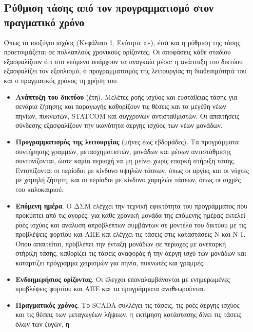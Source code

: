 \subsection{Ρύθμιση τάσης από τον προγραμματισμό στον πραγματικό χρόνο}
\label{sec:v-stages}

Όπως το ισοζύγιο ισχύος (Κεφάλαιο 1, Ενότητα «»), έτσι και η ρύθμιση της
τάσης προετοιμάζεται σε πολλαπλούς χρονικούς ορίζοντες. Οι αποφάσεις κάθε σταδίου εξασφαλίζουν
ότι στο επόμενο υπάρχουν τα αναγκαία μέσα: η ανάπτυξη του δικτύου εξασφαλίζει τον εξοπλισμό, ο
προγραμματισμός της λειτουργίας τη διαθεσιμότητά του και ο πραγματικός χρόνος τη χρήση του.

\begin{itemize}
\item \textbf{Ανάπτυξη του δικτύου} (έτη). Μελέτες ροής ισχύος και ευστάθειας τάσης για
      σενάρια ζήτησης και παραγωγής καθορίζουν τις θέσεις και τα μεγέθη νέων πηνίων, πυκνωτών,
      STATCOM και σύγχρονων αντισταθμιστών. Οι απαιτήσεις σύνδεσης εξασφαλίζουν την ικανότητα
      άεργης ισχύος των νέων μονάδων.
\item \textbf{Προγραμματισμός της λειτουργίας} (μήνες έως εβδομάδες). Τα προγράμματα
      συντήρησης γραμμών, μετασχηματιστών, μονάδων και μέσων αντιστάθμισης συντονίζονται,
      ώστε καμία περιοχή να μη μείνει χωρίς επαρκή στήριξη τάσης. Εντοπίζονται οι περίοδοι με
      κίνδυνο υψηλών τάσεων, όπως οι αργίες και οι νύχτες με χαμηλή ζήτηση, και οι περίοδοι με
      κίνδυνο χαμηλών τάσεων, όπως οι αιχμές του καλοκαιριού.
\item \textbf{Επόμενη ημέρα}. Ο ΔΣΜ ελέγχει την τεχνική εφικτότητα του προγράμματος που
      προκύπτει από τις αγορές: για κάθε χρονική μονάδα της επόμενης ημέρας εκτελεί ροές
      ισχύος και ανάλυση απρόβλεπτων συμβάντων σε μοντέλο του δικτύου με τις προβλέψεις φορτίου
      και ΑΠΕ και ελέγχει τις τάσεις στις καταστάσεις N και N-1. Όπου απαιτείται, προβλέπει την
      ένταξη μονάδων σε περιοχές με ανεπαρκή στήριξη τάσης, καθορίζει τις τάσεις αναφοράς ή την
      άεργη ισχύ των μονάδων και καταρτίζει πρόγραμμα χειρισμών για πηνία, πυκνωτές και
      γραμμές.
\item \textbf{Ενδοημερήσιος ορίζοντας}. Οι έλεγχοι επαναλαμβάνονται με ενημερωμένες
      προβλέψεις φορτίου και ΑΠΕ και τα προγράμματα αναθεωρούνται.
\item \textbf{Πραγματικός χρόνος}. Το SCADA συλλέγει τις τάσεις, τις ροές άεργης ισχύος και τις
      θέσεις των μεταγωγέων λήψεων, η εκτίμηση κατάστασης δίνει τις τάσεις όλων των ζυγών, η

\end{itemize}
